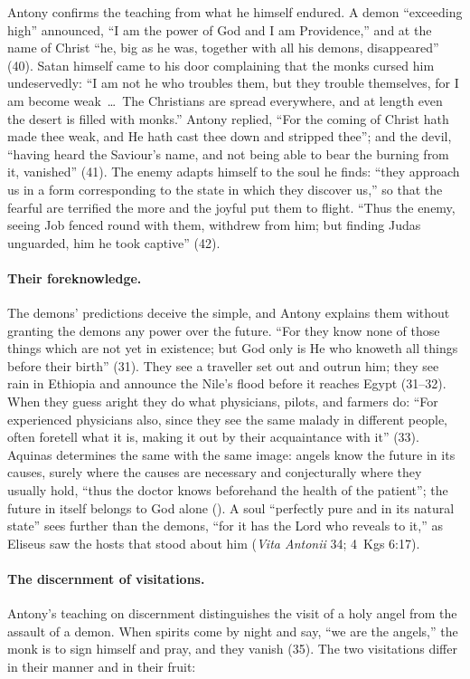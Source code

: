 Antony confirms the teaching from what he himself endured. A demon
``exceeding high'' announced, ``I am the power of God and I am
Providence,'' and at the name of Christ ``he, big as he was, together
with all his demons, disappeared'' (40). Satan himself came to his door
complaining that the monks cursed him undeservedly: ``I am not he who
troubles them, but they trouble themselves, for I am become weak~\dots\
The Christians are spread everywhere, and at length even the desert is
filled with monks.'' Antony replied, ``For the coming of Christ hath made
thee weak, and He hath cast thee down and stripped thee''; and the devil,
``having heard the Saviour's name, and not being able to bear the burning
from it, vanished'' (41). The enemy adapts himself to the soul he finds:
``they approach us in a form corresponding to the state in which they
discover us,'' so that the fearful are terrified the more and the joyful
put them to flight. ``Thus the enemy, seeing Job fenced round with them,
withdrew from him; but finding Judas unguarded, him he took captive''
(42).

\paragraph{Their foreknowledge.} The demons' predictions deceive the
simple, and Antony explains them without granting the demons any power
over the future. ``For they know none of those things which are not yet in
existence; but God only is He who knoweth all things before their
birth'' (31). They see a traveller set out and outrun him; they see rain
in Ethiopia and announce the Nile's flood before it reaches Egypt (31--32).
When they guess aright they do what physicians, pilots, and farmers do:
``For experienced physicians also, since they see the same malady in
different people, often foretell what it is, making it out by their
acquaintance with it'' (33). Aquinas determines the same with the same
image: angels know the future in its causes, surely where the causes are
necessary and conjecturally where they usually hold, ``thus the doctor
knows beforehand the health of the patient''; the future in itself
belongs to God alone (\ST{I q.~57 a.~3}). A soul ``perfectly pure and in
its natural state'' sees further than the demons, ``for it has the Lord
who reveals to it,'' as Eliseus saw the hosts that stood about him
(\emph{Vita Antonii} 34; 4~Kgs 6:17).

\paragraph{The discernment of visitations.} Antony's teaching on
discernment distinguishes the visit of a holy angel from the assault of a
demon. When spirits come by night and say, ``we are the angels,'' the
monk is to sign himself and pray, and they vanish (35). The two
visitations differ in their manner and in their fruit:

